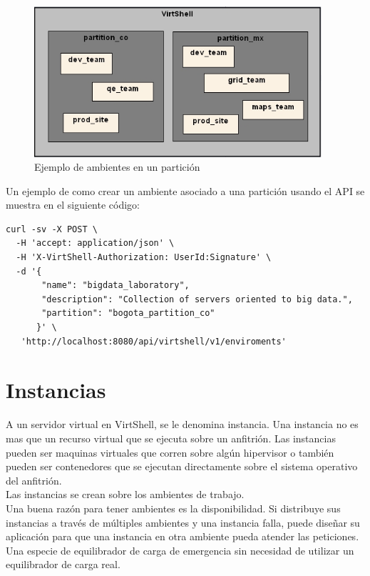 \begin{figure}[h]
    \centering
	\caption{Ejemplo de ambientes en un partición}
	\label{fig:enviroment}
	\includegraphics[width = 0.95\textwidth]{../architecture/v1/diagrams/enviroments}
\end{figure}

Un ejemplo de como crear un ambiente asociado a una partición usando el API se muestra en el siguiente código:

\begin{lstlisting}[style=json, caption=Petición HTTP para crear un ambiente]
curl -sv -X POST \
  -H 'accept: application/json' \
  -H 'X-VirtShell-Authorization: UserId:Signature' \
  -d '{
       "name": "bigdata_laboratory",
       "description": "Collection of servers oriented to big data.", 
       "partition": "bogota_partition_co"
      }' \
   'http://localhost:8080/api/virtshell/v1/enviroments'
\end{lstlisting}

\section{Instancias}
A un servidor virtual en VirtShell, se le denomina instancia. Una instancia no es mas que un recurso virtual que se ejecuta sobre un anfitrión. Las instancias pueden ser maquinas virtuales que corren sobre algún hipervisor o también pueden ser contenedores que se ejecutan directamente sobre el sistema operativo del anfitrión.
\\
Las instancias se crean sobre los ambientes de trabajo.
\\
Una buena razón para tener ambientes es la disponibilidad. Si distribuye sus instancias a través de múltiples ambientes y una instancia falla, puede diseñar su aplicación para que una instancia en otra ambiente pueda atender las peticiones. Una especie de equilibrador de carga de emergencia sin necesidad de utilizar un equilibrador de carga real.


